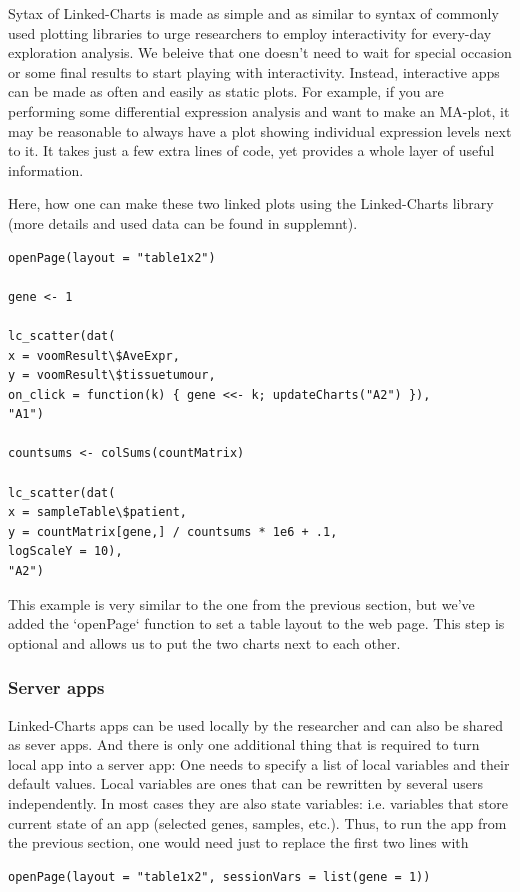 \documentclass[twocolumn,10pt]{article}
\begin{document}
Sytax of Linked-Charts is made as simple and as similar to syntax of commonly used plotting libraries to urge researchers to employ interactivity for every-day exploration analysis. We beleive that one doesn't need to wait for special occasion or some final results to start playing with interactivity. Instead, interactive apps can be made as often and easily as static plots. For example, if you are performing some differential expression analysis and want to make an MA-plot, it may be reasonable to always have a plot showing individual expression levels next to it. It takes just a few extra lines of code, yet provides a whole layer of useful information.

Here, how one can make these two linked plots using the Linked-Charts library (more details and used data can be found in supplemnt).

\begin{verbatim}
openPage(layout = "table1x2")

gene <- 1

lc_scatter(dat(
x = voomResult\$AveExpr,
y = voomResult\$tissuetumour,
on_click = function(k) { gene <<- k; updateCharts("A2") }),
"A1")

countsums <- colSums(countMatrix)

lc_scatter(dat(
x = sampleTable\$patient,
y = countMatrix[gene,] / countsums * 1e6 + .1,
logScaleY = 10),
"A2")
\end{verbatim}

This example is very similar to the one from the previous section, but we've added the `openPage` function to set a table layout to the web page. This step is optional and allows us to put the two charts next to each other.

\subsubsection{Server apps}
Linked-Charts apps can be used locally by the researcher and can also be shared as sever apps. And there is only one additional thing that is required to turn local app into a server app: One needs to specify a list of local variables and their default values. Local variables are ones that can be rewritten by several users independently. In most cases they are also state variables: i.e. variables that store current state of an app (selected genes, samples, etc.). Thus, to run the app from the previous section, one would need just to replace the first two lines with
\begin{verbatim}
openPage(layout = "table1x2", sessionVars = list(gene = 1))
\end{verbatim}
\end{document}
